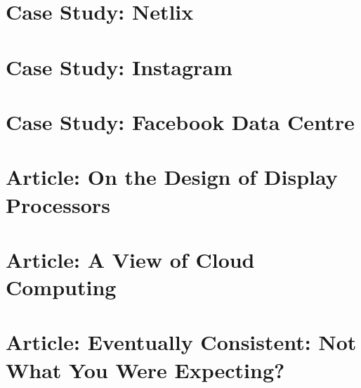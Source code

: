 \documentclass[11pt]{article}
\begin{document}
\section{Case Study: Netlix}


\section{Case Study: Instagram}


\section{Case Study: Facebook Data Centre}


\section{Article: On the Design of Display Processors}


\section{Article: A View of Cloud Computing}


\section{Article: Eventually Consistent: Not What You Were Expecting?}
\end{document}
